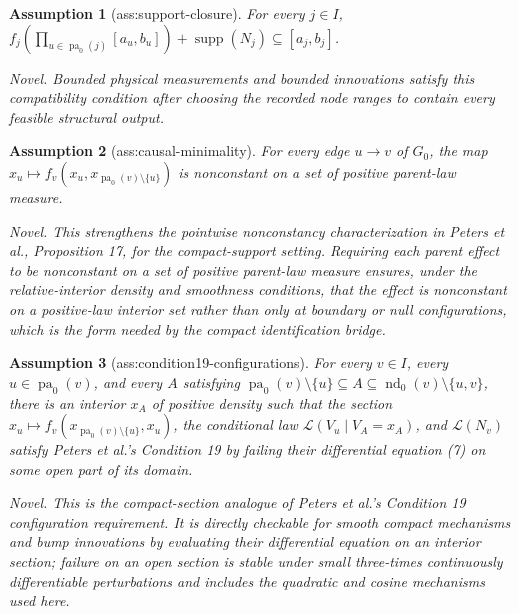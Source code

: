 \documentclass{article}
\newtheorem{assumption}{Assumption}
\begin{document}
\begin{assumption}[ass:support-closure]\label{ass:support-closure}
For every \(j\in I\), \(f_j(\prod_{u\in\operatorname{pa}_0(j)}[a_u,b_u])+\operatorname{supp}(N_j)\subseteq[a_j,b_j]\).
\par\smallskip\noindent\emph{Novel.} Bounded physical measurements and bounded innovations satisfy this compatibility condition after choosing the recorded node ranges to contain every feasible structural output.
\end{assumption}

\begin{assumption}[ass:causal-minimality]\label{ass:causal-minimality}
For every edge \(u\to v\) of \(G_0\), the map \(x_u\mapsto f_v(x_u,x_{\operatorname{pa}_0(v)\setminus\{u\}})\) is nonconstant on a set of positive parent-law measure.
\par\smallskip\noindent\emph{Novel.} This strengthens the pointwise nonconstancy characterization in Peters et al., Proposition 17, for the compact-support setting. Requiring each parent effect to be nonconstant on a set of positive parent-law measure ensures, under the relative-interior density and smoothness conditions, that the effect is nonconstant on a positive-law interior set rather than only at boundary or null configurations, which is the form needed by the compact identification bridge.
\end{assumption}

\begin{assumption}[ass:condition19-configurations]\label{ass:condition19-configurations}
For every \(v\in I\), every \(u\in\operatorname{pa}_0(v)\), and every \(A\) satisfying \(\operatorname{pa}_0(v)\setminus\{u\}\subseteq A\subseteq\operatorname{nd}_0(v)\setminus\{u,v\}\), there is an interior \(x_A\) of positive density such that the section \(x_u\mapsto f_v(x_{\operatorname{pa}_0(v)\setminus\{u\}},x_u)\), the conditional law \(\mathcal L(V_u\mid V_A=x_A)\), and \(\mathcal L(N_v)\) satisfy Peters et al.'s Condition 19 by failing their differential equation (7) on some open part of its domain.
\par\smallskip\noindent\emph{Novel.} This is the compact-section analogue of Peters et al.'s Condition 19 configuration requirement. It is directly checkable for smooth compact mechanisms and bump innovations by evaluating their differential equation on an interior section; failure on an open section is stable under small three-times continuously differentiable perturbations and includes the quadratic and cosine mechanisms used here.
\end{assumption}
\end{document}

